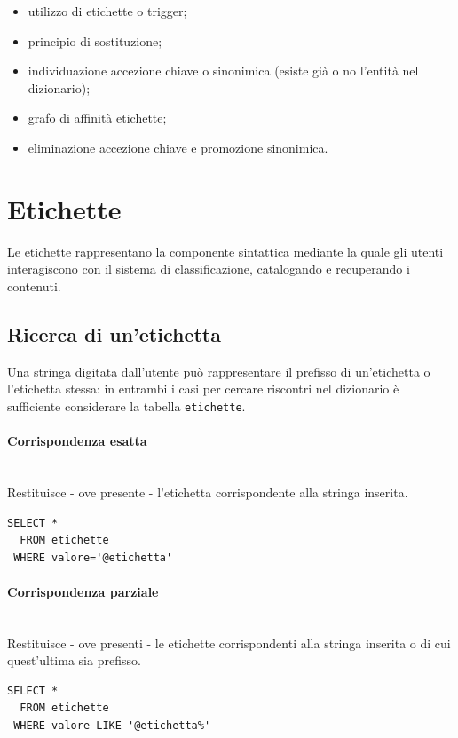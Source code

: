 \documentclass[10pt,a4paper,headinclude,footinclude,hidelinks]{scrreprt} %
\begin{document}
	\begin{itemize}
	\item utilizzo di etichette o trigger;
	\item principio di sostituzione;
	\item individuazione accezione chiave o sinonimica (esiste già o no l'entità nel dizionario);
	\item grafo di affinità etichette;
	\item eliminazione accezione chiave e promozione sinonimica.
	\end{itemize}

	\section{Etichette}
	\label{ch:stage:er:operazioni:etichette}
	Le etichette rappresentano la componente sintattica mediante la quale gli utenti interagiscono con il sistema di classificazione, catalogando e recuperando i contenuti.

	\subsection{Ricerca di un'etichetta}
	\label{ch:stage:er:operazioni:etichette:ricerca}
	Una stringa digitata dall'utente può rappresentare il prefisso di un'etichetta o l'etichetta stessa: in entrambi i casi per cercare riscontri nel dizionario è sufficiente considerare la tabella \texttt{etichette}.

	\paragraph{Corrispondenza esatta} \hfill \\
	Restituisce - ove presente - l'etichetta corrispondente alla stringa inserita.

\begin{verbatim}
SELECT *
  FROM etichette	
 WHERE valore='@etichetta'
\end{verbatim}

	\paragraph{Corrispondenza parziale} \hfill \\
	Restituisce - ove presenti - le etichette corrispondenti alla stringa inserita o di cui quest'ultima sia prefisso.

\begin{verbatim}
SELECT *
  FROM etichette	
 WHERE valore LIKE '@etichetta%'
\end{verbatim}
\end{document}
